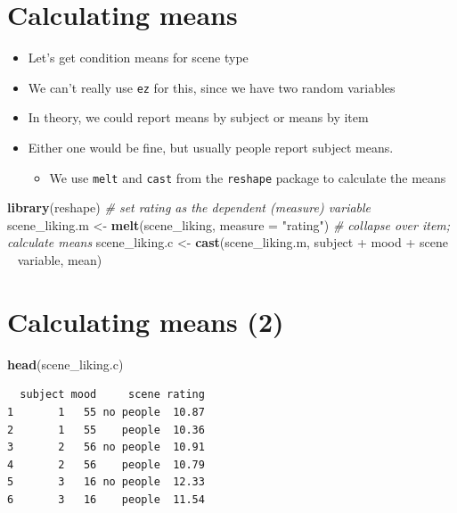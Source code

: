 \documentclass[]{article}
\newenvironment{Shaded}{}{}
\newcommand{\KeywordTok}[1]{\textcolor[rgb]{0.00,0.44,0.13}{\textbf{{#1}}}}
\newcommand{\DataTypeTok}[1]{\textcolor[rgb]{0.56,0.13,0.00}{{#1}}}
\newcommand{\StringTok}[1]{\textcolor[rgb]{0.25,0.44,0.63}{{#1}}}
\newcommand{\CommentTok}[1]{\textcolor[rgb]{0.38,0.63,0.69}{\textit{{#1}}}}
\newcommand{\NormalTok}[1]{{#1}}
\begin{document}
\section{Calculating means}\label{calculating-means}

\begin{itemize}
\itemsep1pt\parskip0pt
\item
  Let's get condition means for scene type
\item
  We can't really use \texttt{ez} for this, since we have two random
  variables
\item
  In theory, we could report means by subject or means by item
\item
  Either one would be fine, but usually people report subject means.

  \begin{itemize}
  \itemsep1pt\parskip0pt
  \item
    We use \texttt{melt} and \texttt{cast} from the \texttt{reshape}
    package to calculate the means
  \end{itemize}
\end{itemize}

\begin{Shaded}
\begin{Highlighting}[]
\KeywordTok{library}\NormalTok{(reshape)}
\CommentTok{# set rating as the dependent (measure) variable}
\NormalTok{scene_liking.m <-}\StringTok{ }\KeywordTok{melt}\NormalTok{(scene_liking, }\DataTypeTok{measure =} \StringTok{"rating"}\NormalTok{)}
\CommentTok{# collapse over item; calculate means}
\NormalTok{scene_liking.c <-}\StringTok{ }\KeywordTok{cast}\NormalTok{(scene_liking.m, subject +}\StringTok{ }\NormalTok{mood +}\StringTok{ }\NormalTok{scene ~}\StringTok{ }\NormalTok{variable, mean)}
\end{Highlighting}
\end{Shaded}

\section{Calculating means (2)}\label{calculating-means-2}

\begin{Shaded}
\begin{Highlighting}[]
\KeywordTok{head}\NormalTok{(scene_liking.c)}
\end{Highlighting}
\end{Shaded}

\begin{verbatim}
  subject mood     scene rating
1       1   55 no people  10.87
2       1   55    people  10.36
3       2   56 no people  10.91
4       2   56    people  10.79
5       3   16 no people  12.33
6       3   16    people  11.54
\end{verbatim}
\end{document}
